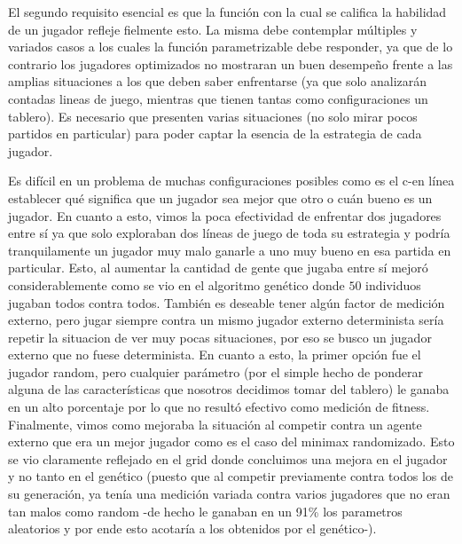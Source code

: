 \documentclass[A4paper,oneside,fleqn,11pt]{article}
\theoremstyle{definition}
\begin{document}
El segundo requisito esencial es que la función con la cual se califica la habilidad de un jugador refleje fielmente esto. La misma debe contemplar múltiples y variados casos a los cuales la función parametrizable debe responder, ya que de lo contrario los jugadores optimizados no mostraran un buen desempeño frente a las amplias situaciones a los que deben saber enfrentarse (ya que solo analizarán contadas lineas de juego, mientras que tienen tantas como configuraciones un tablero). Es necesario que presenten varias situaciones (no solo mirar pocos partidos en particular) para poder captar la esencia de la estrategia de cada jugador.

 Es difícil en un problema de muchas configuraciones posibles como es el c-en línea establecer qué significa que un jugador sea mejor que otro o cuán bueno es un jugador. En cuanto a esto, vimos la poca efectividad de enfrentar dos jugadores entre sí ya que solo exploraban dos líneas de juego de toda su estrategia y podría tranquilamente un jugador muy malo ganarle a uno muy bueno en esa partida en particular. Esto, al aumentar la cantidad de gente que jugaba entre sí mejoró considerablemente como se vio en el algoritmo genético donde $50$ individuos jugaban todos contra todos. También es deseable tener algún factor de medición externo, pero jugar siempre contra un mismo jugador externo determinista sería repetir la situacion de ver muy pocas situaciones, por eso se busco un jugador externo que no fuese determinista. En cuanto a esto, la primer opción fue el jugador random, pero cualquier parámetro (por el simple hecho de ponderar alguna de las características que nosotros decidimos tomar del tablero) le ganaba en un alto porcentaje por lo que no resultó efectivo como medición de fitness. Finalmente, vimos como mejoraba la situación al competir contra un agente externo que era un mejor jugador como es el caso del minimax randomizado. Esto se vio claramente reflejado en el grid donde concluimos una mejora en el jugador y no tanto en el genético (puesto que al competir previamente contra todos los de su generación, ya tenía una medición variada contra varios jugadores que no eran tan malos como random -de hecho le ganaban en un 91\% los parametros aleatorios y por ende esto acotaría a los obtenidos por el genético-).
\end{document}

